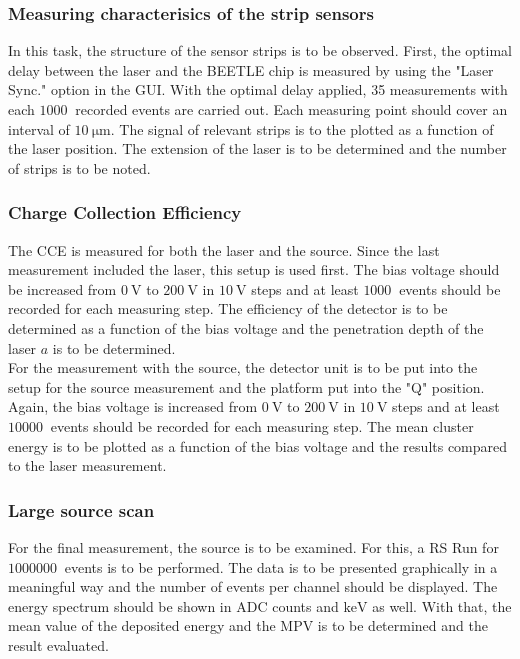 \subsubsection{Measuring characterisics of the strip sensors}
\label{measure:4}
In this task, the structure of the sensor strips is to be observed. First, the optimal delay between the laser
and the BEETLE chip is measured by using the "Laser Sync." option in the GUI. With the optimal delay applied, 
35 measurements with each $\qty{1000}{}$ recorded events are carried out. Each measuring point should cover an interval
of $\qty{10}{\micro\metre}$. The signal of relevant strips is to the plotted as a function of the laser position. 
The extension of the laser is to be determined and the number of strips is to be noted.

\subsubsection{Charge Collection Efficiency}
\label{measure:5}
The CCE is measured for both the laser and the source. Since the last measurement included the laser, this setup is used
first. The bias voltage should be increased from $\qty{0}{\volt}$ to $\qty{200}{\volt}$ in $\qty{10}{\volt}$ steps and 
at least $\qty{1000}{}$ events should be recorded for each measuring step. The efficiency of the detector is to be determined
as a function of the bias voltage and the penetration depth of the laser $a$ is to be determined.\\
For the measurement with the source, the detector unit is to be put into the setup for the source measurement and the platform
put into the "Q" position. Again, the bias voltage is increased from $\qty{0}{\volt}$ to $\qty{200}{\volt}$ in $\qty{10}{\volt}$ steps
and at least $\qty{10000}{}$ events should be recorded for each measuring step. The mean cluster energy is to be plotted as a function
of the bias voltage and the results compared to the laser measurement.

\subsubsection{Large source scan}
\label{measure:6}
For the final measurement, the source is to be examined. For this, a RS Run for $\qty{1000000}{}$ events is to be performed.
The data is to be presented graphically in a meaningful way and the number of events per channel should be displayed.
The energy spectrum should be shown in ADC counts and $\unit{\kilo\electronvolt}$ as well. With that, the mean value of the 
deposited energy and the MPV is to be determined and the result evaluated.
